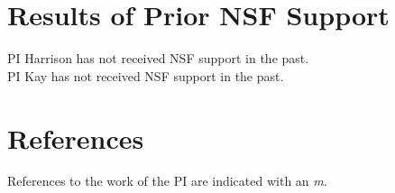\documentclass[11pt]{article}
\begin{document}
\section{Results of Prior NSF Support}
\noindent PI Harrison has not received NSF support in the past.\\
\noindent PI Kay has not received NSF support in the past.

\newpage
\setcounter{page}{1}
\section*{References}
References to the work of the PI are indicated with an \emph{m}.




\end{document}
